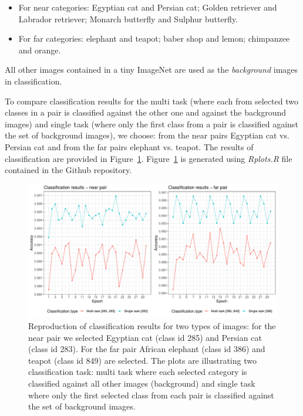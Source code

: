 \documentclass{article} %
\begin{document}
\begin{itemize}
	\item For near categories: Egyptian cat and Persian cat; Golden retriever and Labrador retriever; Monarch butterfly and Sulphur butterfly.
	\item For far categories: elephant and teapot; baber shop and lemon; chimpanzee and orange.
\end{itemize}  

All other images contained in a tiny ImageNet are used as the \textit{background} images in classification.

To compare classification results for the multi task (where each from selected two classes in a pair is classified against the other one and against the background images) and single task (where only the first class from a pair is classified against the set of background images), we choose: from the near pairs Egyptian cat vs. Persian cat and from the far pairs elephant vs. teapot. The results of classification are provided in Figure~\ref{Fig:ClassResults}. Figure~\ref{Fig:ClassResults} is generated using \textit{Rplots.R} file contained in the Github repository.

\begin{figure}[h!t]
	\centering 
	\includegraphics[width=1.0\linewidth]{ClassificationResults.pdf}
	\caption{Reproduction of classification results for two types of images: for the near pair we selected Egyptian cat (class id 285) and Persian cat (class id 283). For the far pair African elephant (class id 386) and teapot (class id 849) are selected. The plots are illustrating two classification task: multi task where each selected category is classified against all other images (background) and single task where only the first selected class from each pair is classified against the set of background images.}
	\label{Fig:ClassResults} 
\end{figure}




\end{document}
